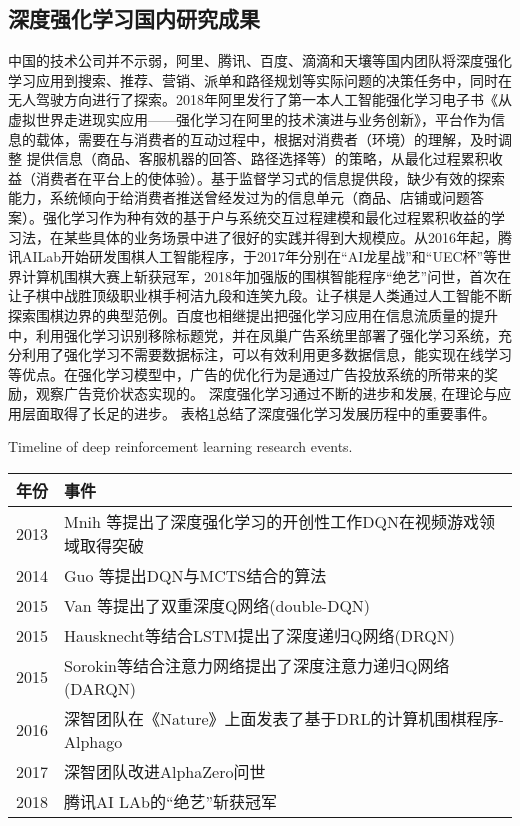 \subsection{深度强化学习国内研究成果}
中国的技术公司并不示弱，阿里、腾讯、百度、滴滴和天壤等国内团队将深度强化学习应用到搜索、推荐、营销、派单和路径规划等实际问题的决策任务中，同时在无人驾驶方向进行了探索。2018年阿里发行了第一本人工智能强化学习电子书《从虚拟世界走进现实应用——强化学习在阿里的技术演进与业务创新》，平台作为信息的载体，需要在与消费者的互动过程中，根据对消费者（环境）的理解，及时调整 提供信息（商品、客服机器的回答、路径选择等）的策略，从最化过程累积收益（消费者在平台上的使体验）。基于监督学习式的信息提供段，缺少有效的探索能力，系统倾向于给消费者推送曾经发过为的信息单元（商品、店铺或问题答案）。强化学习作为种有效的基于户与系统交互过程建模和最化过程累积收益的学习法，在某些具体的业务场景中进了很好的实践并得到大规模应。从2016年起，腾讯AILab开始研发围棋人工智能程序，于2017年分别在“AI龙星战”和“UEC杯”等世界计算机围棋大赛上斩获冠军，2018年加强版的围棋智能程序“绝艺”问世，首次在让子棋中战胜顶级职业棋手柯洁九段和连笑九段。让子棋是人类通过人工智能不断探索围棋边界的典型范例。百度也相继提出把强化学习应用在信息流质量的提升中，利用强化学习识别移除标题党，并在凤巢广告系统里部署了强化学习系统，充分利用了强化学习不需要数据标注，可以有效利用更多数据信息，能实现在线学习等优点。在强化学习模型中，广告的优化行为是通过广告投放系统的所带来的奖励，观察广告竞价状态实现的。
深度强化学习通过不断的进步和发展, 在理论与应用层面取得了长足的进步。 表格\ref{tab:1}总结了深度强化学习发展历程中的重要事件。
\begin{table}[htpb]
	\centering
	{Timeline of deep reinforcement learning research events.}
	\label{tab:1}
	\begin{tabular}{ll}
		年份 & 事件 \\ \midrule
		2013 & Mnih 等提出了深度强化学习的开创性工作DQN在视频游戏领域取得突破 \\
		2014& Guo 等提出DQN与MCTS结合的算法 \\
		2015 &Van 等提出了双重深度Q网络(double-DQN) \\
		2015&Hausknecht等结合LSTM提出了深度递归Q网络(DRQN)\\
		2015&Sorokin等结合注意力网络提出了深度注意力递归Q网络(DARQN)\\
		2016&深智团队在《Nature》上面发表了基于DRL的计算机围棋程序-Alphago\\
		2017&深智团队改进AlphaZero问世\\
		2018&腾讯AI LAb的“绝艺”斩获冠军\\
		 \bottomrule
	\end{tabular}
\end{table}
